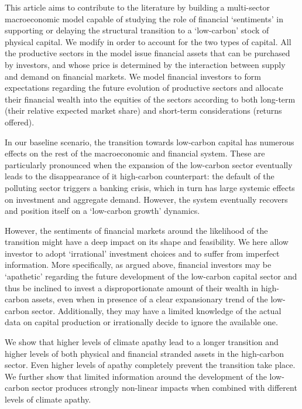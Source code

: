 \documentclass[authoryear]{article}
\begin{document}
This article aims to contribute to the literature by building a multi-sector macroeconomic model capable of studying the role of financial `sentiments' in supporting or delaying the structural transition to a `low-carbon' stock of physical capital. We modify \citet{Caiani2014} in order to account for the two types of capital. All the productive sectors in the model issue financial assets that can be purchased by investors, and whose price is determined by the interaction between supply and demand on financial markets. We model financial investors to form expectations regarding the future evolution of productive sectors and allocate their financial wealth into the equities of the sectors according to both long-term (their relative expected market share) and short-term considerations (returns offered).

In our baseline scenario, the transition towards low-carbon capital has numerous effects on the rest of the macroeconomic and financial system. These are particularly pronounced when the expansion of the low-carbon sector eventually leads to the disappearance of it high-carbon counterpart: the default of the polluting sector triggers a banking crisis, which in turn has large systemic effects on investment and aggregate demand. However, the system eventually recovers and position itself on a `low-carbon growth' dynamics.

However, the sentiments of financial markets around the likelihood of the transition might have a deep impact on its shape and feasibility. We here allow investor to adopt `irrational' investment choices and to suffer from imperfect information. More specifically, as argued above, financial investors may be `apathetic' regarding the future development of the low-carbon capital sector and thus be inclined to invest a disproportionate amount of their wealth in high-carbon assets, even when in presence of a clear expansionary trend of the low-carbon sector. Additionally, they may have a limited knowledge of the actual data on capital production or irrationally decide to ignore the available one. 

We show that higher levels of  climate apathy lead to a longer transition and higher levels of both physical and financial stranded assets in the high-carbon sector. Even higher levels of apathy completely prevent the transition take place. We further show that limited information around the development of the low-carbon sector produces strongly non-linear impacts when combined with different levels of climate apathy. 
\end{document}
